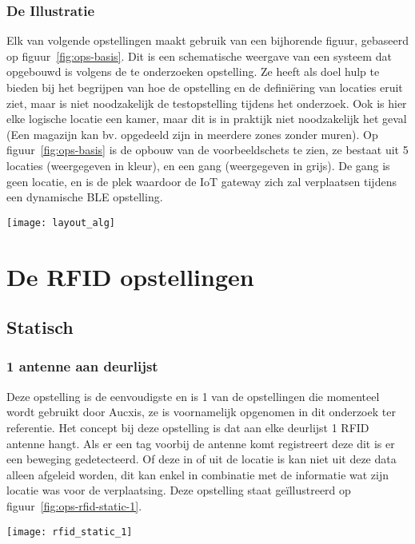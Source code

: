 \subsubsection{De Illustratie}
\begin{minipage}{0.65\textwidth}
Elk van volgende opstellingen maakt gebruik van een bijhorende figuur, gebaseerd op figuur~\ref{fig:ops-basis}. Dit is een schematische weergave van een systeem dat opgebouwd is volgens de te onderzoeken opstelling. Ze heeft als doel hulp te bieden bij het begrijpen van hoe de opstelling en de definiëring van locaties eruit ziet, maar is niet noodzakelijk de testopstelling tijdens het onderzoek. Ook is hier elke logische locatie een kamer, maar dit is in praktijk niet noodzakelijk het geval (Een magazijn kan bv. opgedeeld zijn in meerdere zones zonder muren). Op figuur~\ref{fig:ops-basis} is de opbouw van de voorbeeldschets te zien, ze bestaat uit 5 locaties (weergegeven in kleur), en een gang (weergegeven in grijs). De gang is geen locatie, en is de plek waardoor de IoT gateway zich zal verplaatsen tijdens een dynamische BLE opstelling.
\end{minipage}
\hfill
\begin{minipage}{0.30\textwidth}
	\texttt{[image: layout\_alg]}
	\label{fig:ops-basis}
\end{minipage}

\section[RFID]{De RFID opstellingen}
\label{sec:ops-rfid}

\subsection{Statisch}
\subsubsection{1 antenne aan deurlijst}
\begin{minipage}{0.65\textwidth}
Deze opstelling is de eenvoudigste en is 1 van de opstellingen die momenteel wordt gebruikt door Aucxis, ze is voornamelijk opgenomen in dit onderzoek ter referentie. Het concept bij deze opstelling is dat aan elke deurlijst 1 RFID antenne hangt. Als er een tag voorbij de antenne komt registreert deze dit is er een beweging gedetecteerd. Of deze in of uit de locatie is kan niet uit deze data alleen afgeleid worden, dit kan enkel in combinatie met de informatie wat zijn locatie was voor de verplaatsing. Deze opstelling staat geïllustreerd op figuur~\ref{fig:ops-rfid-static-1}.
\end{minipage}
\hfill
\begin{minipage}{0.30\textwidth}
	\texttt{[image: rfid\_static\_1]}
	\label{fig:ops-rfid-static-1}
\end{minipage}

